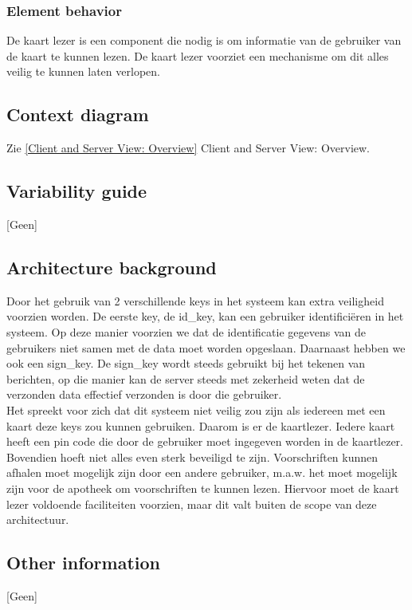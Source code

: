 \documentclass[a4paper,10pt]{article}
\begin{document}
\subsubsection*{Element behavior}
De kaart lezer is een component die nodig is om informatie van de gebruiker van de kaart te kunnen lezen.  De kaart lezer voorziet een mechanisme om dit alles veilig te kunnen laten verlopen.

\subsection{Context diagram}
Zie \ref{Client and Server View: Overview} Client and Server View: Overview.

\subsection{Variability guide}
[Geen]

\subsection{Architecture background}
Door het gebruik van 2 verschillende keys in het systeem kan extra veiligheid voorzien worden.  De eerste key, de id\_key, kan een gebruiker identifici\"{e}ren in het systeem.  Op deze manier voorzien we dat de identificatie gegevens van de gebruikers niet samen met de data moet worden opgeslaan.  Daarnaast hebben we ook een sign\_key.  De sign\_key wordt steeds gebruikt bij het tekenen van berichten, op die manier kan de server steeds met zekerheid weten dat de verzonden data effectief verzonden is door die gebruiker.\\

Het spreekt voor zich dat dit systeem niet veilig zou zijn als iedereen met een kaart deze keys zou kunnen gebruiken.  Daarom is er de kaartlezer.  Iedere kaart heeft een pin code die door de gebruiker moet ingegeven worden in de kaartlezer.  Bovendien hoeft niet alles even sterk beveiligd te zijn.  Voorschriften kunnen afhalen moet mogelijk zijn door een andere gebruiker, m.a.w. het moet mogelijk zijn voor de apotheek om voorschriften te kunnen lezen.  Hiervoor moet de kaart lezer voldoende faciliteiten voorzien, maar dit valt buiten de scope van deze architectuur.

\subsection{Other information}
[Geen]
\end{document}
